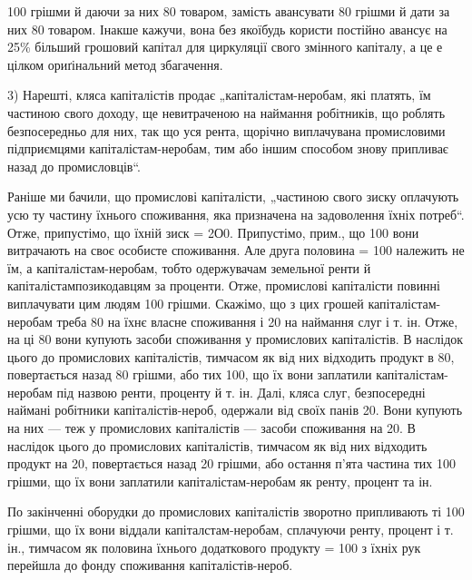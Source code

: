 \parcont{}  %
100 грішми й даючи за них 80 товаром, замість авансувати 80 грішми й
дати за них 80 товаром. Інакше кажучи, вона без якоїбудь користи постійно авансує на 25\%
більший грошовий капітал для циркуляції свого змінного капіталу, а це е цілком ориґінальний метод
збагачення.

3) Нарешті, кляса капіталістів продає „капіталістам-неробам, які платять, їм частиною свого доходу,
ще невитраченою на наймання робітників, що роблять безпосередньо для них, так що уся рента, щорічно
виплачувана промисловими підприємцями капіталістам-неробам, тим або іншим способом знову припливає
назад до промисловців“.

Раніше ми бачили, що промислові капіталісти, „частиною свого зиску оплачують усю ту частину їхнього
споживання, яка призначена на задоволення їхніх потреб“. Отже, припустімо, що їхній зиск = 2О0. Припустімо, прим., що 100 вони витрачають на своє особисте споживання. Але друга
половина = 100 належить не їм, а капіталістам-неробам, тобто одержувачам земельної ренти й
капіталістампозикодавцям
за проценти. Отже, промислові капіталісти повинні виплачувати цим людям 100 грішми.
Скажімо, що з цих грошей капіталістам-неробам треба 80 на їхнє власне споживання і 20 на наймання слуг і т. ін. Отже, на ці 80 вони купують засоби споживання у
промислових капіталістів. В наслідок цього до промислових капіталістів, тимчасом як від них
відходить продукт в 80, повертається назад 80 грішми, або  тих 100,
що їх вони заплатили капіталістам-неробам під назвою ренти, проценту й т. ін. Далі, кляса слуг,
безпосередні наймані робітники капіталістів-нероб, одержали від своїх панів 20. Вони
купують на них — теж у промислових капіталістів — засоби споживання на 20. В наслідок цього
до промислових капіталістів, тимчасом як від них відходить продукт на 20, повертається
назад 20 грішми, або остання п’ята частина тих 100 грішми, що їх вони заплатили
капіталістам-неробам як ренту, процент та ін.

По закінченні оборудки до промислових капіталістів зворотно припливають ті 100 грішми, що
їх вони віддали капіталстам-неробам, сплачуючи ренту, процент і т. ін., тимчасом як половина їхнього
додаткового продукту = 100 з їхніх рук перейшла до фонду споживання капіталістів-нероб.

